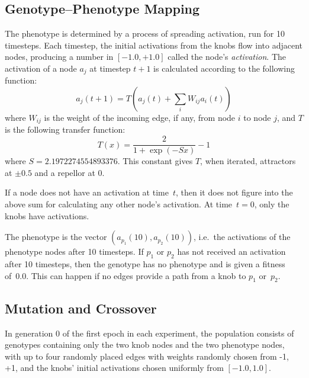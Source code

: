 \documentclass[letterpaper]{article}
\begin{document}
\subsection{Genotype--Phenotype Mapping}

The phenotype is determined by a process of spreading activation, run for
10 timesteps. Each timestep, the initial activations from the knobs flow into
adjacent nodes, producing a number in $[-1.0, +1.0]$ called the node's
\textit{activation}. The activation of a node $a_j$ at timestep $t+1$ is
calculated according to the following function:
\[
   a_j(t+1) = T(a_j(t) + \sum_iW_{ij}a_i(t))
\]
where $W_{ij}$ is the weight of the incoming edge, if any, from node $i$ to
node $j$, and $T$ is the following transfer function:
\[
   T(x) = \frac{2}{1+\exp(-Sx)}-1
\]
where $S=2.1972274554893376$. This constant gives $T$, when iterated,
attractors at $\pm0.5$ and a repellor at 0.

If a node does not have an activation at time~$t$, then it does not figure
into the above sum for calculating any other node's activation. At time~$t=0$,
only the knobs have activations.

The phenotype is the vector $(a_{p_1}(10), a_{p_2}(10))$, i.e.~the activations
of the phenotype nodes after 10 timesteps. If $p_1$ or $p_2$ has not received
an activation after 10 timesteps, then the genotype has no phenotype and is
given a fitness of~0.0. This can happen if no edges provide a path from a knob
to $p_1$ or~$p_2$.

\subsection{Mutation and Crossover}

In generation 0 of the first epoch in each experiment, the population consists
of genotypes containing only the two knob nodes and the two phenotype nodes,
with up to four randomly placed edges with weights randomly chosen from {-1,
+1}, and the knobs' initial activations chosen uniformly from $[-1.0, 1.0]$.
\end{document}
